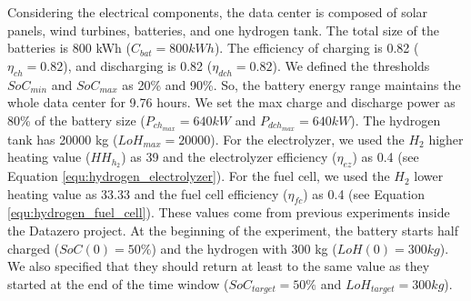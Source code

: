 Considering the electrical components, the data center is composed of solar panels, wind turbines, batteries, and one hydrogen tank. The total size of the batteries is 800 kWh ($C_{bat}=800kWh$). The efficiency of charging is 0.82 ($\eta_{ch}=0.82$), and discharging is 0.82 ($\eta_{dch}=0.82$). We defined the thresholds $SoC_{min}$ and $SoC_{max}$ as 20\% and 90\%. So, the battery energy range maintains the whole data center for 9.76 hours. We set the max charge and discharge power as 80\% of the battery size ($P_{ch_{max}}=640kW$ and $P_{dch_{max}}=640kW$). The hydrogen tank has 20000 kg ($LoH_{max}=20000$). For the electrolyzer, we used the $H_2$ higher heating value ($HH_{h_{2}}$) as 39 and the electrolyzer efficiency ($\eta_{ez}$) as 0.4 (see Equation \ref{equ:hydrogen_electrolyzer}). For the fuel cell, we used the $H_2$ lower heating value as 33.33 and the fuel cell efficiency ($\eta_{fc}$) as 0.4 (see Equation \ref{equ:hydrogen_fuel_cell}). These values come from previous experiments inside the Datazero project. 
At the beginning of the experiment, the battery starts half charged ($SoC(0)=50\%$) and the hydrogen with 300 kg ($LoH(0)=300kg$). We also specified that they should return at least to the same value as they started at the end of the time window ($SoC_{target} = 50\%$ and $LoH_{target}=300kg$).

